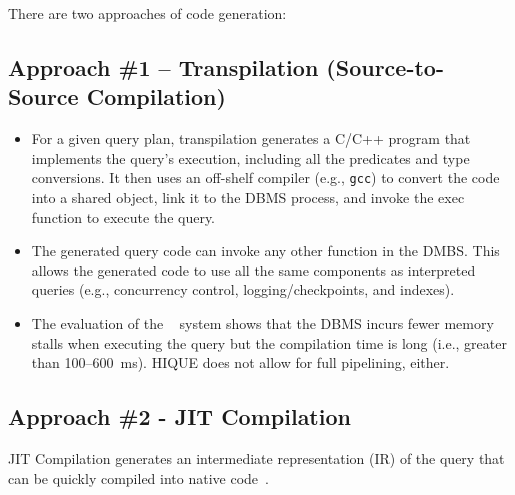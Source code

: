 \documentclass[11pt]{article}
\begin{document}
There are two approaches of code generation:
\subsection*{Approach \#1 -- Transpilation (Source-to-Source Compilation)}
\begin{itemize}
	\item 
	For a given query plan, transpilation generates a C/C++ program that implements the query's 
	execution, including all the predicates and type conversions.
	It then uses an off-shelf compiler (e.g., \texttt{gcc}) to convert the code into a shared 
	object, link it to the DBMS process, and invoke the exec function to execute the query.
	
	\item 
	The generated query code can invoke any other function in the DMBS.
	This allows the generated code to use all the same components as interpreted queries (e.g., 
	concurrency control, logging/checkpoints, and indexes).
	
	\item 
	The evaluation of the ~\cite{krikellas2010} system shows that the DBMS incurs fewer 
	memory stalls when executing the query but the compilation time is long (i.e., 
	greater than 100--600~ms). HIQUE does not allow for full pipelining, either.
\end{itemize}

\subsection*{Approach \#2 - JIT Compilation}
JIT Compilation generates an intermediate representation (IR) of the query that can be quickly 
compiled into native code~\cite{neumann2011}.
\end{document}
